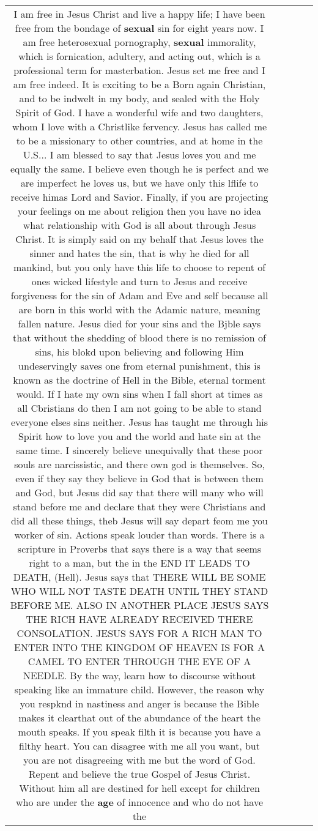 \documentclass[11pt]{article}
\newlength\mylength
\begin{document}
\begin{center}
\begin{longtable}{|C{.65\mylength}|C{.30\mylength}|C{.12\mylength}|C{.12\mylength}|C{.12\mylength}|}
  \small I am free in Jesus Christ and live a happy life; I have been free from the bondage of \textbf{sexual} sin for eight years now. I am free heterosexual pornography, \textbf{sexual} immorality, which is fornication, adultery, and acting out, which is a professional term for masterbation. Jesus set me free and I am free indeed. It is exciting to be a Born again Christian, and to be indwelt in my body, and sealed with the Holy Spirit of God. I have a wonderful wife and two daughters, whom I love with a Christlike fervency. Jesus has called me to be a missionary to other countries, and at home in the U.S... I am blessed to say that Jesus loves you and me equally the same. I believe even though he is perfect and we are imperfect he loves us, but we have only this lflife to receive himas Lord and Savior. Finally, if you are projecting your feelings on me about religion then you have no idea what relationship with God is all about through Jesus Christ. It is simply said on my behalf that Jesus loves the sinner and hates the sin, that is why he died for all mankind, but you only have this life to choose to repent of ones wicked lifestyle and turn to Jesus and receive forgiveness for the sin of Adam and Eve and self because all are born in this world with the Adamic nature, meaning fallen nature. Jesus died for your sins and the Bjble says that without the shedding of blood there is no remission of sins, his blokd upon believing and following Him undeservingly saves one from eternal punishment, this is known as the doctrine of Hell in the Bible, eternal torment would. If I hate my own sins when I fall short at times as all Cbristians do then I am not going to be able to stand everyone elses sins neither. Jesus has taught me through his Spirit how to love you and the world and hate sin at the same time. I sincerely believe unequivally that these poor souls are narcissistic, and there own god is themselves. So, even if they say they believe in God that is between them and God, but Jesus did say that there will many who will stand before me and declare that they were Christians and did all these things, theb Jesus will say depart feom me you worker of sin. Actions speak louder than words. There is a scripture in Proverbs that says there is a way that seems right to a man, but the in the END IT LEADS TO DEATH, (Hell). Jesus says that THERE WILL BE SOME WHO WILL NOT TASTE DEATH UNTIL THEY STAND BEFORE ME. ALSO IN ANOTHER PLACE JESUS SAYS THE RICH HAVE ALREADY RECEIVED THERE CONSOLATION. JESUS SAYS FOR A RICH MAN TO ENTER INTO THE KINGDOM OF HEAVEN IS FOR A CAMEL TO ENTER THROUGH THE EYE OF A NEEDLE. By the way, learn how to discourse without speaking like an immature child. However, the reason why you respknd in nastiness and anger is because the Bible makes it clearthat out of the abundance of the heart the mouth speaks. If you speak filth it is because you have a filthy heart. You can disagree with me all you want, but you are not disagreeing with me but the word of God. Repent and believe the true Gospel of Jesus Christ. Without him all are destined for hell except for children who are under the \textbf{age} of innocence and who do not have the 
\end{longtable}
\end{center}
\end{document}
